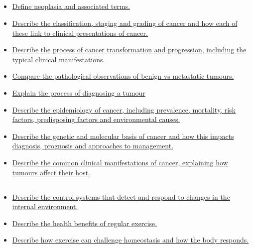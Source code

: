 \documentclass[10pt, a4paper]{article}
\newcommand{\MYhref}[3][blue]{\href{#2}{\color{#1}{#3}}}%
\begin{document}
\subsection{\MYhref[melbBlue]{https://notion.so/9938d83f8d5f4cdaa201821fb6b0f4a5}{Neoplasia}} \begin{itemize} \item \href{https://www.notion.so/5beec9e8e7a4432a93ffb0fbcda06208}{Define neoplasia and associated terms.} \item \href{https://www.notion.so/922359657db34ef39dab1c0ca41cf532}{Describe the classification, staging and grading of cancer and how each of these link to clinical presentations of cancer.} \item \href{https://www.notion.so/bf2f409bf0354e3997ab93814284ebe8}{Describe the process of cancer transformation and progression, including the typical clinical manifestations.} \item \href{https://www.notion.so/7dc2911963364d37a7a230dd5b61a25c}{Compare the pathological observations of benign vs metastatic tumours.} \item \href{https://www.notion.so/920fed39ff364f4d88e22c868b0fec38}{Explain the process of diagnosing a tumour} \item \href{https://www.notion.so/3cd3f543211b4226bd2652f60187f159}{Describe the epidemiology of cancer, including prevalence, mortality, risk factors, predisposing factors and environmental causes.} \item \href{https://www.notion.so/4bb46374a49341048488679d93487fc9}{Describe the genetic and molecular basis of cancer and how this impacts diagnosis, prognosis and approaches to management.} \item \href{https://www.notion.so/62bd2276a1184afc90de2e2e7220360d}{Describe the common clinical manifestations of cancer, explaining how tumours affect their host.} \end{itemize}
\subsection{\MYhref[melbBlue]{https://notion.so/7eda073f11a74d73a0199a9ba47bce45}{Exercise, Mortality and Health}} \begin{itemize} \item \href{https://www.notion.so/7a2e4f97867b4a6e85a0ae419673a29e}{Describe the control systems that detect and respond to changes in the internal environment.} \item \href{https://www.notion.so/624f6d9b36694af8aa03a3214dbdcbc4}{Describe the health benefits of regular exercise.} \item \href{https://www.notion.so/3713bba013844582b827784eb10f9f7a}{Describe how exercise can challenge homeostasis and how the body responds.} \end{itemize}
\end{document}
